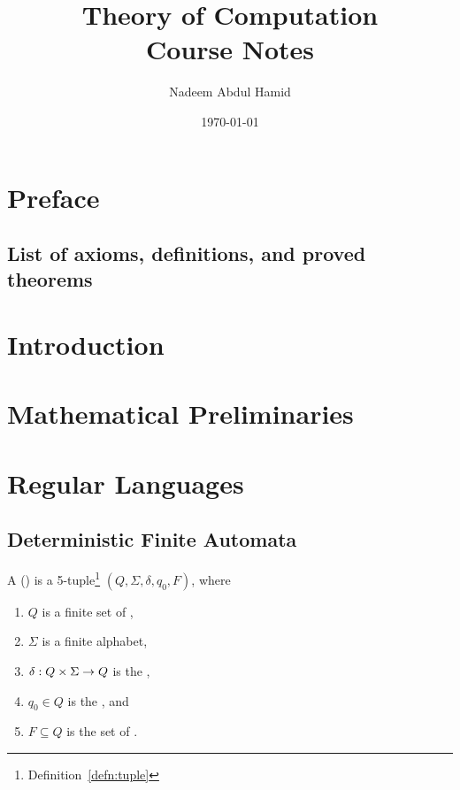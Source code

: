\documentclass[twoside,letterpaper,openany]{book}
\title{Theory of Computation \\ \vspace{2mm} {\large Course Notes}}
\author{Nadeem Abdul Hamid}
\date{\today}
\begin{document}
\maketitle

\chapter*{Preface}


\setcounter{secnumdepth}{0}
\tableofcontents

\newpage
\section{List of axioms, definitions, and proved theorems}

\setcounter{chapter}{-1}
\chapter{Introduction}\label{chapter:intro}
	

\chapter{Mathematical Preliminaries}
	
	
	
	\clearpage 
	
	\clearpage
	
	\clearpage
	

\chapter{Regular Languages}
\section{Deterministic Finite Automata}
\begin{defn}
A  () is a 5-tuple\footnote{Definition~\ref{defn:tuple}} $(Q, \Sigma, \delta, q_0, F)$, where
\begin{enumerate}
\item $Q$ is a finite set of ,
\item $\Sigma$ is a finite alphabet,
\item $\delta : Q \times \Sigma \to Q$ is the ,
\item $q_0 \in Q$ is the , and
\item $F \subseteq Q$ is the set of .
\end{enumerate}
\end{defn}
\end{document}
